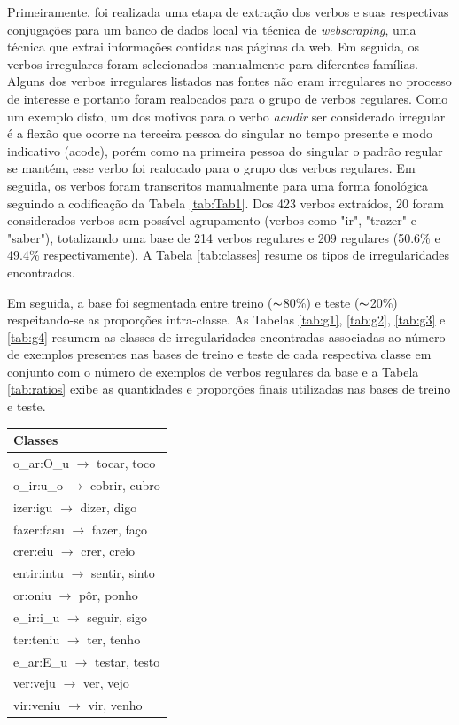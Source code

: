Primeiramente, foi realizada uma etapa de extração dos verbos e suas respectivas conjugações para um banco de dados local via técnica de \textit{webscraping}, uma técnica que extrai informações contidas nas páginas da web. Em seguida, os verbos irregulares foram selecionados manualmente para diferentes famílias. Alguns dos verbos irregulares listados nas fontes não eram irregulares no processo de interesse e portanto foram realocados para o grupo de verbos regulares. Como um exemplo disto, um dos motivos para o verbo \textit{acudir} ser considerado irregular é a flexão que ocorre na terceira pessoa do singular no tempo presente e modo indicativo (acode), porém como na primeira pessoa do singular o padrão regular se mantém, esse verbo foi realocado para o grupo dos verbos regulares. Em seguida, os verbos foram transcritos manualmente para uma forma fonológica seguindo a codificação da Tabela \ref{tab:Tab1}. Dos 423 verbos extraídos, 20 foram considerados verbos sem possível agrupamento (verbos como "ir", "trazer" e "saber"), totalizando uma base de 214 verbos regulares e 209 regulares (50.6\% e 49.4\% respectivamente). A Tabela \ref{tab:classes} resume os tipos de irregularidades encontrados. 

Em seguida, a base foi segmentada entre treino ($\thicksim$80\%) e teste ($\thicksim$20\%) respeitando-se as proporções intra-classe. As Tabelas \ref{tab:g1}, \ref{tab:g2}, \ref{tab:g3} e \ref{tab:g4} resumem as classes de irregularidades encontradas associadas ao número de exemplos presentes nas bases de treino e teste de cada respectiva classe em conjunto com o número de exemplos de verbos regulares da base e a Tabela \ref{tab:ratios} exibe as quantidades e proporções finais utilizadas nas bases de treino e teste.


\begin{table}[H]
\begin{center}
\begin{tabular}{l}
Classes\\
\toprule
o\_ar:O\_u $\rightarrow$ tocar, toco\\
o\_ir:u\_o $\rightarrow$ cobrir, cubro\\
izer:igu $\rightarrow$ dizer, digo\\
fazer:fasu $\rightarrow$ fazer, faço\\
crer:eiu $\rightarrow$ crer, creio\\
entir:intu $\rightarrow$ sentir, sinto\\
or:oniu $\rightarrow$ pôr, ponho\\
e\_ir:i\_u $\rightarrow$ seguir, sigo\\
ter:teniu $\rightarrow$ ter, tenho\\
e\_ar:E\_u $\rightarrow$ testar, testo\\
ver:veju $\rightarrow$ ver, vejo\\
vir:veniu $\rightarrow$ vir, venho
\end{tabular}
\end{center}
\end{table}
\label{tab:classes}


